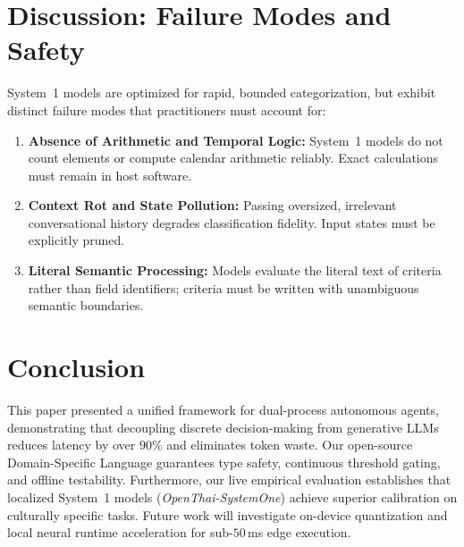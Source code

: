 \documentclass[10pt,twocolumn,letterpaper]{article}
\begin{document}
\section{Discussion: Failure Modes and Safety}
System~1 models are optimized for rapid, bounded categorization, but exhibit distinct failure modes that practitioners must account for:
\begin{enumerate}
    \item \textbf{Absence of Arithmetic and Temporal Logic:} System~1 models do not count elements or compute calendar arithmetic reliably. Exact calculations must remain in host software.
    \item \textbf{Context Rot and State Pollution:} Passing oversized, irrelevant conversational history degrades classification fidelity. Input states must be explicitly pruned.
    \item \textbf{Literal Semantic Processing:} Models evaluate the literal text of criteria rather than field identifiers; criteria must be written with unambiguous semantic boundaries.
\end{enumerate}

\section{Conclusion}
This paper presented a unified framework for dual-process autonomous agents, demonstrating that decoupling discrete decision-making from generative LLMs reduces latency by over $90\%$ and eliminates token waste. Our open-source Domain-Specific Language guarantees type safety, continuous threshold gating, and offline testability. Furthermore, our live empirical evaluation establishes that localized System~1 models (\textit{OpenThai-SystemOne}) achieve superior calibration on culturally specific tasks. Future work will investigate on-device quantization and local neural runtime acceleration for sub-$50$\,ms edge execution.



\end{document}
